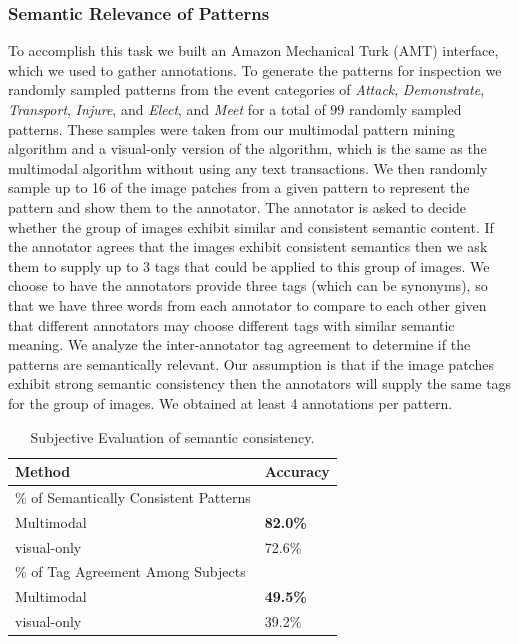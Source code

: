 \documentclass[10pt,twocolumn,letterpaper]{article}
\begin{document}
{\subsubsection{Semantic Relevance of Patterns}
\label{sec:sematic_eval}
To accomplish this task we built an Amazon Mechanical Turk (AMT) interface, which we used to gather annotations.
To generate the patterns for inspection we randomly sampled patterns from the event categories of {\it Attack}, {\it Demonstrate}, {\it Transport}, {\it Injure}, and {\it Elect}, and {\it Meet} for a total of $99$ randomly sampled patterns.
These samples were taken from our multimodal pattern mining algorithm and a visual-only version of the algorithm, which is the same as the multimodal algorithm without using any text transactions.
We then randomly sample up to 16 of the image patches from a given pattern to represent the pattern and show them to the annotator.
The annotator is asked to decide whether the group of images exhibit similar and consistent semantic content.
If the annotator agrees that the images exhibit consistent semantics then we ask them to supply up to 3 tags that could be applied to this group of images.
We choose to have the annotators provide three tags (which can be synonyms), so that we have three words from each annotator to compare to each other given that different annotators may choose different tags with similar semantic meaning.
We analyze the inter-annotator tag agreement to determine if the patterns are semantically relevant.
Our assumption is that if the image patches exhibit strong semantic consistency then the annotators will supply the same tags for the group of images.
We obtained at least 4 annotations per pattern.

\begin{table}
\centering
\caption{Subjective Evaluation of semantic consistency.}
\begin{tabular}{ll}
\hline
\hline
Method & Accuracy \\ \hline
\% of Semantically Consistent Patterns \\
Multimodal & {\bf 82.0\%} \\
visual-only & 72.6\% \\ \hline
\% of Tag Agreement Among Subjects\\
Multimodal & {\bf 49.5\%} \\
visual-only & 39.2\% \\ \hline
\end{tabular}
\label{tab:semantic_meaning}
\end{table}

}
\end{document}
